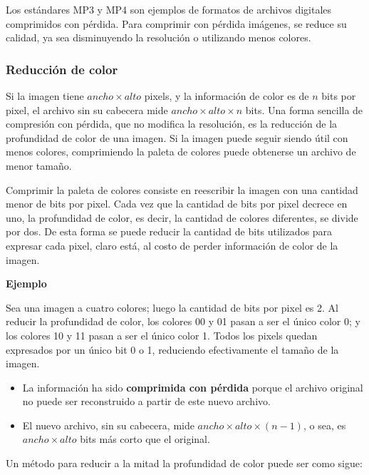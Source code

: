 \documentclass[spanish,a4paper,]{article}
\providecommand{\tightlist}{%
  \setlength{\itemsep}{0pt}\setlength{\parskip}{0pt}}
\begin{document}
Los estándares MP3 y MP4 son ejemplos de formatos de archivos digitales
comprimidos con pérdida. Para comprimir con pérdida imágenes, se reduce
su calidad, ya sea disminuyendo la resolución o utilizando menos
colores.

\hypertarget{reducciuxf3n-de-color}{%
\subsubsection{Reducción de color}\label{reducciuxf3n-de-color}}

Si la imagen tiene \(ancho \times alto\) pixels, y la información de
color es de \(n\) bits por pixel, el archivo sin su cabecera mide
\(ancho \times alto \times n\) bits. Una forma sencilla de compresión
con pérdida, que no modifica la resolución, es la reducción de la
profundidad de color de una imagen. Si la imagen puede seguir siendo
útil con menos colores, comprimiendo la paleta de colores puede
obtenerse un archivo de menor tamaño.

Comprimir la paleta de colores consiste en reescribir la imagen con una
cantidad menor de bits por pixel. Cada vez que la cantidad de bits por
pixel decrece en uno, la profundidad de color, es decir, la cantidad de
colores diferentes, se divide por dos. De esta forma se puede reducir la
cantidad de bits utilizados para expresar cada pixel, claro está, al
costo de perder información de color de la imagen.

\textbf{Ejemplo}

Sea una imagen a cuatro colores; luego la cantidad de bits por pixel es
2. Al reducir la profundidad de color, los colores 00 y 01 pasan a ser
el único color 0; y los colores 10 y 11 pasan a ser el único color 1.
Todos los pixels quedan expresados por un único bit 0 o 1, reduciendo
efectivamente el tamaño de la imagen.

\begin{itemize}
\tightlist
\item
  La información ha sido \textbf{comprimida con pérdida} porque el
  archivo original no puede ser reconstruido a partir de este nuevo
  archivo.
\item
  El nuevo archivo, sin su cabecera, mide
  \(ancho \times alto \times (n - 1)\), o sea, es \(ancho \times alto\)
  bits más corto que el original.
\end{itemize}

Un método para reducir a la mitad la profundidad de color puede ser como
sigue:
\end{document}
